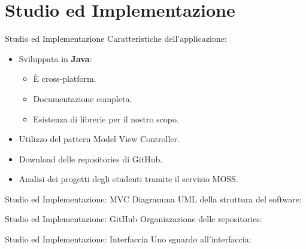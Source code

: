 \documentclass{beamer}
\begin{document}
	\section{Studio ed Implementazione}
	
	\begin{frame}{Studio ed Implementazione}
		Caratteristiche dell'applicazione:
		\begin{itemize}
			\item<1-> Sviluppata in \textbf{Java}:
				\begin{itemize}
					\item \`E cross-platform.
					\item Documentazione completa.
					\item Esistenza di librerie per il nostro scopo.
				\end{itemize}
			\item<2-> Utilizzo del pattern Model View Controller.
			\item<3-> Download delle repositories di GitHub.
			\item<4-> Analisi dei progetti degli studenti tramite il servizio MOSS.
		\end{itemize}
	\end{frame}
	
	\begin{frame}{Studio ed Implementazione: MVC}
		Diagramma UML della struttura del software:
		\begin{center}
		\end{center}
	\end{frame}
	
	\begin{frame}{Studio ed Implementazione: GitHub}
		\vspace{-0.2cm}
		Organizzazione delle repositories:
		\begin{center}
		\end{center}
	\end{frame}
	
	\begin{frame}{Studio ed Implementazione: Interfaccia}
		\vspace{-0.2cm}
		Uno sguardo all'interfaccia:
		\begin{center}
		\end{center}
	\end{frame}

	
\end{document}
